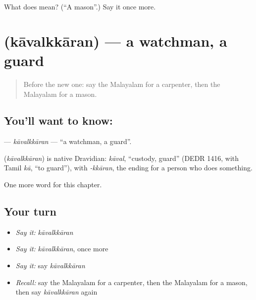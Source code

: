 \begin{tcolorbox}[breakable,colback=teal!4,colframe=teal!35!black,title={Before you move on}]
What does  mean? (\textquotedblleft{}A mason\textquotedblright{}.) Say it once more.
\end{tcolorbox}
\section[\texorpdfstring{\ml{കാവൽക്കാരൻ} (kāvalkkāran)}{കാവൽക്കാരൻ (kāvalkkāran)}]{ (kāvalkkāran) — a watchman, a guard}

\label{lesson:ML-C263-kavalkkaran}



\begin{quote}
Before the new one: say the Malayalam for a carpenter, then the Malayalam for a mason.
\end{quote}

\subsection*{You'll want to know: }
\textbf{} — \emph{kāvalkkāran} — \textquotedblleft{}a watchman, a guard\textquotedblright{}.

\begin{cousinweb}
\textbf{} (\emph{kāvalkkāran}) is native Dravidian: \emph{kāval}, \textquotedblleft{}custody, guard\textquotedblright{} (DEDR 1416, with Tamil \emph{kā}, \textquotedblleft{}to guard\textquotedblright{}), with \emph{-kkāran}, the ending for a person who does something.
\end{cousinweb}

\begin{grammarlens}[title={What you've built}]
One more word for this chapter.
\end{grammarlens}

\subsection*{Your turn}
\begin{itemize}
\raggedright
  \item \emph{Say it:} \emph{kāvalkkāran}
  \item \emph{Say it:} \emph{kāvalkkāran}, once more
  \item \emph{Say it:} say \emph{kāvalkkāran}
  \item \emph{Recall:} say the Malayalam for a carpenter, then the Malayalam for a mason, then say \emph{kāvalkkāran} again
\end{itemize}

